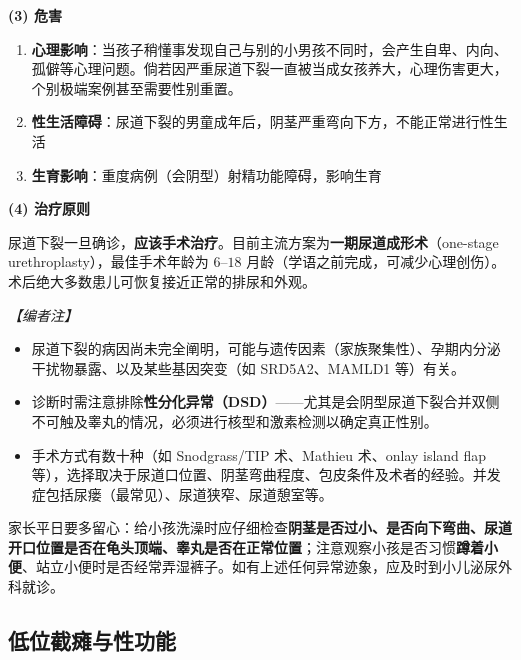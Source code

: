 \vspace{0.3em}
\noindent\textbf{(3) 危害}

\begin{enumerate}
	\item \textbf{心理影响}：当孩子稍懂事发现自己与别的小男孩不同时，会产生自卑、内向、孤僻等心理问题。倘若因严重尿道下裂一直被当成女孩养大，心理伤害更大，个别极端案例甚至需要性别重置。
	\item \textbf{性生活障碍}：尿道下裂的男童成年后，阴茎严重弯向下方，不能正常进行性生活
	\item \textbf{生育影响}：重度病例（会阴型）射精功能障碍，影响生育
\end{enumerate}

\vspace{0.3em}
\noindent\textbf{(4) 治疗原则}

尿道下裂一旦确诊，\textbf{应该手术治疗}。目前主流方案为\textbf{一期尿道成形术}（one-stage urethroplasty），最佳手术年龄为 $6$--$18$ 月龄（学语之前完成，可减少心理创伤）。术后绝大多数患儿可恢复接近正常的排尿和外观。

\vspace{0.3em}
\noindent\textit{【编者注】}
\begin{itemize}
	\item 尿道下裂的病因尚未完全阐明，可能与遗传因素（家族聚集性）、孕期内分泌干扰物暴露、以及某些基因突变（如 SRD5A2、MAMLD1 等）有关。
	\item 诊断时需注意排除\textbf{性分化异常（DSD）}——尤其是会阴型尿道下裂合并双侧不可触及睾丸的情况，必须进行核型和激素检测以确定真正性别。
	\item 手术方式有数十种（如 Snodgrass/TIP 术、Mathieu 术、onlay island flap 等），选择取决于尿道口位置、阴茎弯曲程度、包皮条件及术者的经验。并发症包括尿瘘（最常见）、尿道狭窄、尿道憩室等。
\end{itemize}

\begin{tcolorbox}[colback=pink!5!white,colframe=red!50!black,title=贴心小叮咛]
家长平日要多留心：给小孩洗澡时应仔细检查\textbf{阴茎是否过小、是否向下弯曲、尿道开口位置是否在龟头顶端、睾丸是否在正常位置}；注意观察小孩是否习惯\textbf{蹲着小便}、站立小便时是否经常弄湿裤子。如有上述任何异常迹象，应及时到小儿泌尿外科就诊。
\end{tcolorbox}

\subsection{低位截瘫与性功能}

